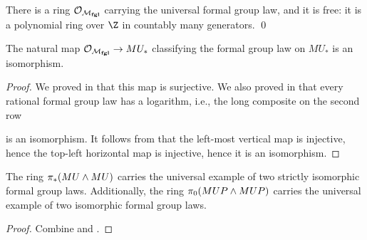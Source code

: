 \begin{theorem}\label{DummyLazardsThm}
There is a ring $\mathcal{O}_{\mathcal{M}_{\mathbf{fgl}}}$ carrying the universal formal group law, and it is free: it is a polynomial ring over $\Z$ in countably many generators. \qed
\end{theorem}

\begin{corollary}\label{QuillensTheorem}
The natural map $\mathcal{O}_{\mathcal{M}_{\mathbf{fgl}}} \to MU_*$ classifying the formal group law on $MU_*$ is an isomorphism.
\end{corollary}
\begin{proof}
We proved in  that this map is surjective.  We also proved in  that every rational formal group law has a logarithm, i.e., the long composite on the second row
\begin{center}
\end{center}
is an isomorphism.  It follows from  that the left-most vertical map is injective, hence the top-left horizontal map is injective, hence it is an isomorphism.
\end{proof}

\begin{corollary}
The ring $\pi_*(MU \wedge MU)$ carries the universal example of two strictly isomorphic formal group laws.  Additionally, the ring $\pi_0 (MUP \wedge MUP)$ carries the universal example of two isomorphic formal group laws.
\end{corollary}
\begin{proof}
Combine  and .
\end{proof}


























